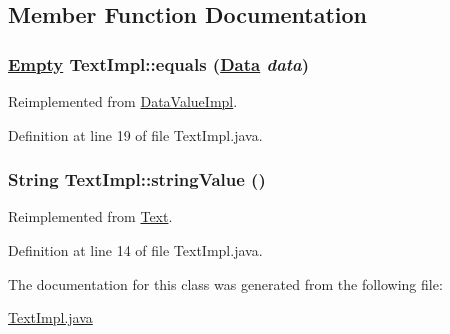 \subsection{Member Function Documentation}
\hypertarget{classTextImpl_a1}{
\subsubsection[equals]{\setlength{\rightskip}{0pt plus 5cm}\hyperlink{interfaceEmpty}{Empty} Text\-Impl::equals (\hyperlink{interfaceData}{Data} {\em data})}}
\label{classTextImpl_a1}




Reimplemented from \hyperlink{classDataValueImpl_a5}{Data\-Value\-Impl}.

Definition at line 19 of file Text\-Impl.java.\hypertarget{classTextImpl_a0}{
\subsubsection[stringValue]{\setlength{\rightskip}{0pt plus 5cm}String Text\-Impl::string\-Value ()}}
\label{classTextImpl_a0}




Reimplemented from \hyperlink{interfaceText_a0}{Text}.

Definition at line 14 of file Text\-Impl.java.

The documentation for this class was generated from the following file:\begin{CompactItemize}
\item 
\hyperlink{TextImpl_8java-source}{Text\-Impl.java}\end{CompactItemize}
